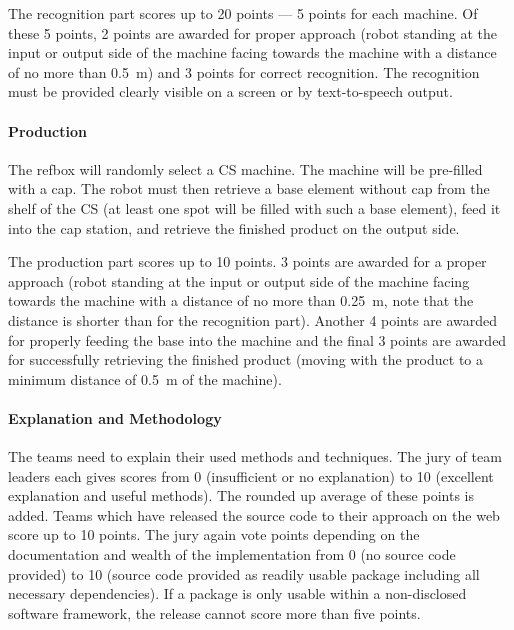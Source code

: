 \documentclass[12pt,twoside]{article}
\begin{document}
The recognition part scores up to 20 points --- 5 points for each
machine. Of these 5 points, 2 points are awarded for proper approach
(robot standing at the input or output side of the machine facing
towards the machine with a distance of no more than \SI{0.5}{\metre})
and 3 points for correct recognition. The recognition must be provided
clearly visible on a screen or by text-to-speech output.

\vspace{-2ex}\paragraph{Production}
The refbox will randomly select a CS machine. The machine will be
pre-filled with a cap. The robot must then retrieve a base element
without cap from the shelf of the CS (at least one spot will be filled
with such a base element), feed it into the cap station, and retrieve
the finished product on the output side.

The production part scores up to 10 points. 3 points are awarded for a
proper approach (robot standing at the input or output side of the
machine facing towards the machine with a distance of no more than
\SI{0.25}{\metre}, note that the distance is shorter than for the
recognition part). Another 4 points are awarded for properly feeding
the base into the machine and the final 3 points are awarded for
successfully retrieving the finished product (moving with the product
to a minimum distance of \SI{0.5}{\metre} of the machine).

\vspace{-2ex}\paragraph{Explanation and Methodology}
%
The teams need to explain their used methods and techniques. The jury
of team leaders each gives scores from 0 (insufficient or no
explanation) to 10 (excellent explanation and useful methods). The
rounded up average of these points is added. Teams which have released
the source code to their approach on the web score up to 10
points. The jury again vote points depending on the documentation and
wealth of the implementation from 0 (no source code provided) to 10
(source code provided as readily usable package including all
necessary dependencies). If a package is only usable within a
non-disclosed software framework, the release cannot score more than
five points.
\end{document}
